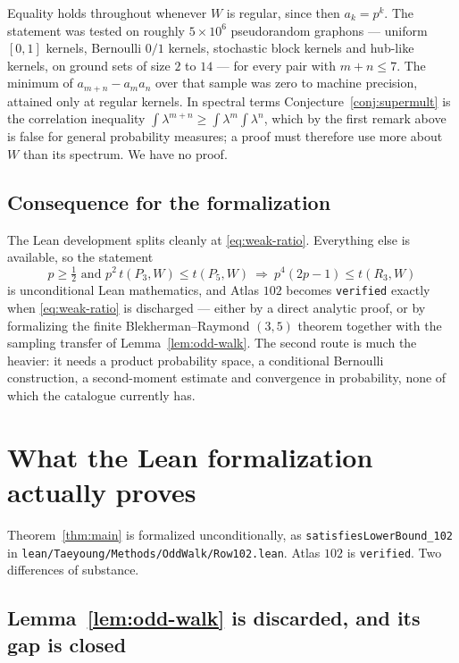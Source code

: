 \documentclass[11pt]{article}
\begin{document}
Equality holds throughout whenever $W$ is regular, since then $a_k=p^k$.  The
statement was tested on roughly $5\times10^6$ pseudorandom graphons --- uniform
$[0,1]$ kernels, Bernoulli $0/1$ kernels, stochastic block kernels and
hub-like kernels, on ground sets of size $2$ to $14$ --- for every pair with
$m+n\leq7$.  The minimum of $a_{m+n}-a_ma_n$ over that sample was zero to
machine precision, attained only at regular kernels.  In spectral terms
Conjecture~\ref{conj:supermult} is the correlation inequality
$\int\lambda^{m+n}\geq\int\lambda^m\int\lambda^n$, which by the first remark
above is false for general probability measures; a proof must therefore use
more about $W$ than its spectrum.  We have no proof.

\subsection{Consequence for the formalization}
\label{sec:consequence}

The Lean development splits cleanly at \eqref{eq:weak-ratio}.  Everything else
is available, so the statement
\[
 \text{$p\geq\tfrac12$ and $p^2\,t(P_3,W)\leq t(P_5,W)$}
 \ \Longrightarrow\
 p^4(2p-1)\leq t(R_3,W)
\]
is unconditional Lean mathematics, and Atlas $102$ becomes \texttt{verified}
exactly when \eqref{eq:weak-ratio} is discharged --- either by a direct
analytic proof, or by formalizing the finite Blekherman--Raymond $(3,5)$
theorem together with the sampling transfer of Lemma~\ref{lem:odd-walk}.  The
second route is much the heavier: it needs a product probability space, a
conditional Bernoulli construction, a second-moment estimate and convergence in
probability, none of which the catalogue currently has.

\section{What the Lean formalization actually proves}

Theorem~\ref{thm:main} is formalized unconditionally, as
\texttt{satisfiesLowerBound\_102} in
\texttt{lean/Taeyoung/Methods/OddWalk/Row102.lean}.  Atlas $102$ is
\texttt{verified}.  Two differences of substance.

\subsection*{Lemma~\ref{lem:odd-walk} is discarded, and its gap is closed}
\end{document}
